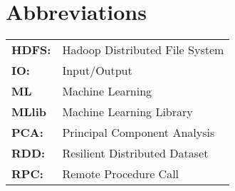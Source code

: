 \chapter*{Abbreviations}



\begin{table}[H]

\begin{center}

\begin{tabularx}{17cm}{ p{1.8cm}X } 
\textbf{\large{HDFS:}}  & \large{Hadoop Distributed File System} \newline \\
\textbf{\large{IO:}}   & \large{Input/Output} \newline\\
\textbf{\large{ML}}   & \large{Machine Learning} \newline \\
\textbf{\large{MLlib}} & \large{Machine Learning Library} \newline \\
\textbf{\large{PCA:}}  & \large{Principal Component Analysis}\newline \\
\textbf{\large{RDD:}}   &  \large{Resilient Distributed Dataset}\newline \\
\textbf{\large{RPC:}}   &  \large{Remote Procedure Call}\newline \\
\end{tabularx}
\end{center}
\end{table}